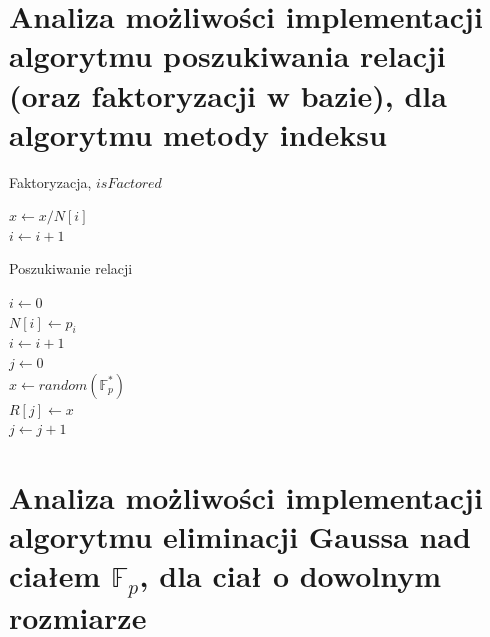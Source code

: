 \documentclass[]{article}
\begin{document}
\section{Analiza możliwości implementacji algorytmu poszukiwania relacji (oraz faktoryzacji w bazie), dla algorytmu metody indeksu}

\begin{algorithm}
	\SetAlgoLined
	\caption{Faktoryzacja, \(isFactored\)}
	{
		{
			\(x \gets x/N[i]\)\\
		}
		\(i \gets i + 1\)
	}
	{
	}
\end{algorithm}

\begin{algorithm}
	\SetAlgoLined
	\caption{Poszukiwanie relacji}
	\label{Relation}
	\(i \gets 0\) \\
	{
		\(N[i] \gets p_i\)\\
		\(i \gets i + 1\)\\
	}
	\(j \gets 0\) \\
	{
		\(x \gets random(\mathbb{F}_p^*)\)\\
		{
			\(R[j] \gets x\)\\
			\(j \gets j + 1\)\\
		}
	}
\end{algorithm}


\section{Analiza możliwości implementacji algorytmu eliminacji Gaussa nad ciałem $\mathbb{F}_p$, dla ciał o dowolnym rozmiarze}~
\end{document}
